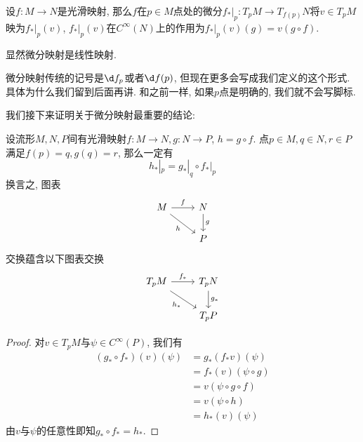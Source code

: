 \begin{defn}
    设$f:M\to N$是光滑映射, 那么$f$在$p\in M$点处的微分$f_*|_p:T_pM\to T_{f(p)}N$将$v\in T_pM$映为$f_*|_p(v)$, $f_*|_p(v)$在$C^\infty(N)$上的作用为$f_*|_p(v)(g)=v(g\circ f)$.
\end{defn}

显然微分映射是线性映射.

\begin{sym}
    微分映射传统的记号是$\d f_p$或者$\d f(p)$, 但现在更多会写成我们定义的这个形式.
    具体为什么我们留到后面再讲.
    和之前一样, 如果$p$点是明确的, 我们就不会写脚标.
\end{sym}

我们接下来证明关于微分映射最重要的结论:

\begin{thm}[链式法则]设流形$M,N,P$间有光滑映射$f:M\to N,g:N\to P$, $h=g\circ f$.
    点$p\in M,q\in N,r\in P$满足$f(p)=q,g(q)=r$, 那么一定有
    \[h_*|_p=g_*|_q\circ f_*|_p\]
    换言之, 图表
    \[\begin{tikzcd}
        M \arrow[r, "f"] \arrow[dr, "h"'] & N \arrow[d, "g"]\\
        & P
    \end{tikzcd}\]
    交换蕴含以下图表交换
    \[\begin{tikzcd}
        T_pM \arrow[r, "f_*"] \arrow[dr, "h_*"'] & T_pN \arrow[d, "g_*"]\\
        & T_pP
    \end{tikzcd}\]
\end{thm}
\begin{proof}
    对$v\in T_pM$与$\psi\in C^\infty(P)$, 我们有
    \begin{align*}
        (g_*\circ f_*)(v)(\psi)&=g_*(f_*v)(\psi)\\
        &=f_*(v)(\psi\circ g)\\
        &=v(\psi\circ g\circ f)\\
        &=v(\psi\circ h)\\
        &=h_*(v)(\psi)
    \end{align*}
    由$v$与$\psi$的任意性即知$g_*\circ f_*=h_*$.
\end{proof}

